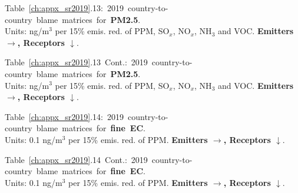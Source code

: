 
\footnotesize{\mbox{Table \ref{ch:appx_sr2019}.13: 2019 country-to-country blame matrices for \textbf{PM2.5}.}\\ Units: ng/m$^3$ per 15\% emis. red. of PPM, SO$_x$, NO$_x$, NH$_3$ and VOC. \textbf{Emitters $\rightarrow$, Receptors $\downarrow$}. }\\[\baselineskip]\enlargethispage{\myenlarge} \hspace{-0.5cm} 
\centerline{}\clearpage
\footnotesize{\mbox{Table \ref{ch:appx_sr2019}.13 Cont.: 2019 country-to-country blame matrices for \textbf{PM2.5}.}\\ Units: ng/m$^3$ per 15\% emis. red. of PPM, SO$_x$, NO$_x$, NH$_3$ and VOC. \textbf{Emitters $\rightarrow$, Receptors $\downarrow$}. }\\[\baselineskip]\enlargethispage{\myenlarge} \hspace{-0.5cm} 
\centerline{}\clearpage



 \footnotesize{\mbox{Table \ref{ch:appx_sr2019}.14: 2019
     country-to-country blame matrices for \textbf{fine EC}.}\\ Units:
   0.1 ng/m$^3$ per 15\% emis. red. of PPM. \textbf{Emitters $\rightarrow$, Receptors $\downarrow$}. }\\[\baselineskip]\enlargethispage{\myenlarge} \hspace{-0.5cm} 
 \centerline{}\clearpage
 \footnotesize{\mbox{Table \ref{ch:appx_sr2019}.14 Cont.: 2019
     country-to-country blame matrices for \textbf{fine EC}.}\\ Units:
   0.1 ng/m$^3$ per 15\% emis. red. of PPM. \textbf{Emitters $\rightarrow$, Receptors $\downarrow$}. }\\[\baselineskip]\enlargethispage{\myenlarge} \hspace{-0.5cm} 
 \centerline{}\clearpage



